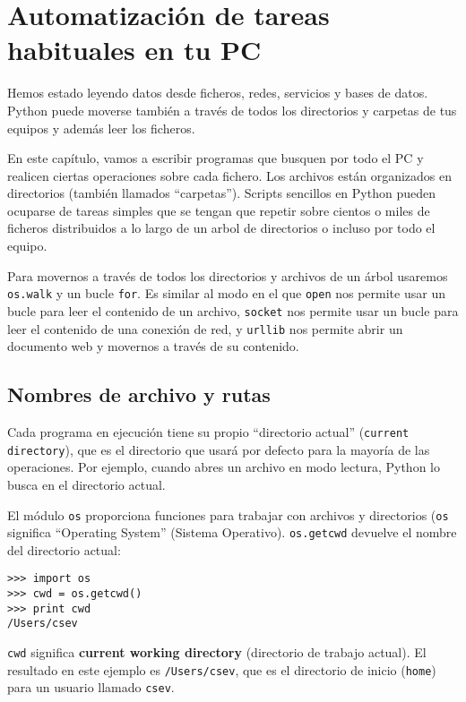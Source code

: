 
\chapter{Automatización de tareas habituales en tu PC}

Hemos estado leyendo datos desde ficheros, redes, servicios y
bases de datos. Python puede moverse también a través de todos los
directorios y carpetas de tus equipos y además leer
los ficheros.

En este capítulo, vamos a escribir programas que busquen
por todo el PC y
realicen ciertas operaciones sobre cada fichero.
Los archivos están organizados en directorios (también llamados ``carpetas'').
Scripts sencillos en Python
pueden ocuparse de tareas simples que se tengan que repetir
sobre cientos o miles de ficheros
distribuidos a lo largo de un arbol de directorios o incluso por todo el equipo.

Para movernos a través de todos los directorios y archivos de un árbol usaremos
{\tt os.walk} y un bucle {\tt for}. Es similar al modo en el que
{\tt open} nos permite usar un bucle para leer el contenido de un archivo,
{\tt socket} nos permite usar un bucle para leer el contenido de una conexión de red, y
{\tt urllib} nos permite abrir un documento web y movernos a través de su contenido. 

\section{Nombres de archivo y rutas}
\label{paths}


Cada programa en ejecución tiene su propio ``directorio actual'' ({\tt current directory}), que es el directorio que
usará por defecto para la mayoría de las operaciones. Por ejemplo, cuando abres un archivo
en modo lectura, Python lo busca en el directorio actual.


El módulo {\tt os} proporciona funciones para trabajar con archivos y
directorios ({\tt os} significa ``Operating System'' (Sistema Operativo).
{\tt os.getcwd} devuelve el nombre del directorio actual:


\beforeverb
\begin{verbatim}
>>> import os
>>> cwd = os.getcwd()
>>> print cwd
/Users/csev
\end{verbatim}
\afterverb
%
{\tt cwd} significa {\bf current working directory} (directorio de trabajo actual). El resultado en
este ejemplo es {\tt /Users/csev}, que es el directorio de inicio ({\tt home}) para un
usuario llamado {\tt csev}.

